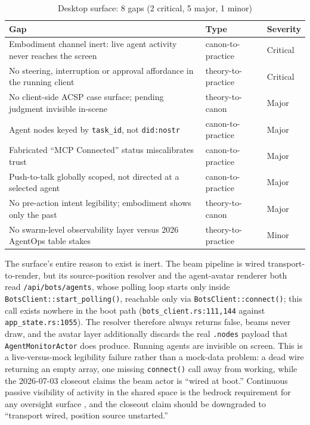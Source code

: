 \begin{table}[h]
\centering
\caption{Desktop surface: 8 gaps (2 critical, 5 major, 1 minor)}
\label{tab:gaps-desktop}
\begin{tabularx}{\textwidth}{X L{3.2cm} L{1.6cm}}
\toprule
\textbf{Gap} & \textbf{Type} & \textbf{Severity} \\
\midrule
Embodiment channel inert: live agent activity never reaches the screen & canon-to-practice & Critical \\
\addlinespace
No steering, interruption or approval affordance in the running client & theory-to-practice & Critical \\
\addlinespace
No client-side ACSP case surface; pending judgment invisible in-scene & theory-to-canon & Major \\
\addlinespace
Agent nodes keyed by \texttt{task\_id}, not \texttt{did:nostr} & canon-to-practice & Major \\
\addlinespace
Fabricated ``MCP Connected'' status miscalibrates trust & canon-to-practice & Major \\
\addlinespace
Push-to-talk globally scoped, not directed at a selected agent & canon-to-practice & Major \\
\addlinespace
No pre-action intent legibility; embodiment shows only the past & theory-to-canon & Major \\
\addlinespace
No swarm-level observability layer versus 2026 AgentOps table stakes & theory-to-practice & Minor \\
\bottomrule
\end{tabularx}
\end{table}

The surface's entire reason to exist is inert. The beam pipeline is wired transport-to-render, but its source-position resolver and the agent-avatar renderer both read \texttt{/api/bots/agents}, whose polling loop starts only inside \texttt{BotsClient::start\_polling()}, reachable only via \texttt{BotsClient::connect()}; this call exists nowhere in the boot path (\texttt{bots\_client.rs:111,144} against \texttt{app\_state.rs:1055}). The resolver therefore always returns false, beams never draw, and the avatar layer additionally discards the real \texttt{.nodes} payload that \texttt{AgentMonitorActor} does produce. Running agents are invisible on screen. This is a live-versus-mock legibility failure rather than a mock-data problem: a dead wire returning an empty array, one missing \texttt{connect()} call away from working, while the 2026-07-03 closeout claims the beam actor is ``wired at boot.'' Continuous passive visibility of activity in the shared space is the bedrock requirement for any oversight surface \parencite{DourishBellotti1992, Epperson2025Debugging}, and the closeout claim should be downgraded to ``transport wired, position source unstarted.''

